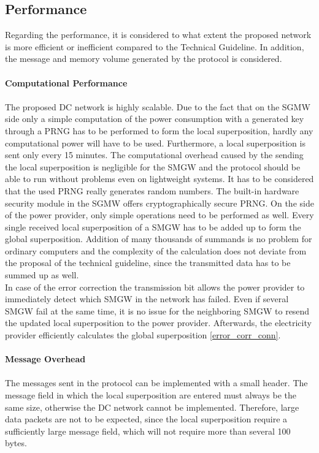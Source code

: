 \subsection{Performance}
\label{performance}
Regarding the performance, it is considered to what extent the proposed network is more efficient or inefficient compared to the Technical Guideline. In addition, the message and memory volume generated by the protocol is considered.
\\
\\
\textbf{Computational Performance}
\\
\\
The proposed DC network is highly scalable. Due to the fact that on the SGMW side only a simple computation of the power consumption with a generated key through a PRNG has to be performed to form the local superposition, hardly any computational power will have to be used. Furthermore, a local superposition is sent only every 15 minutes. The computational overhead caused by the sending the local superposition is negligible for the SMGW and the protocol should be able to run without problems even on lightweight systems. It has to be considered that the used PRNG really generates random numbers. The built-in hardware security module in the SGMW offers cryptographically secure PRNG. On the side of the power provider, only simple operations need to be performed as well. Every single received local superposition of a SMGW has to be added up to form the global superposition. Addition of many thousands of summands is no problem for ordinary computers and the complexity of the calculation does not deviate from the proposal of the technical guideline, since the transmitted data has to be summed up as well.\\
In case of the error correction the transmission bit allows the power provider to immediately detect which SMGW in the network has failed. Even if several SMGW fail at the same time, it is no issue for the neighboring SMGW to resend the updated local superposition to the power provider. Afterwards, the electricity provider efficiently calculates the global superposition \ref{error_corr_conn}.\\
\\
\textbf{Message Overhead}
\\
\\
The messages sent in the protocol can be implemented with a small header. The message field in which the local superposition are entered must always be the same size, otherwise the DC network cannot be implemented. Therefore, large data packets are not to be expected, since the local superposition require a sufficiently large message field, which will not require more than several 100 bytes. \\
